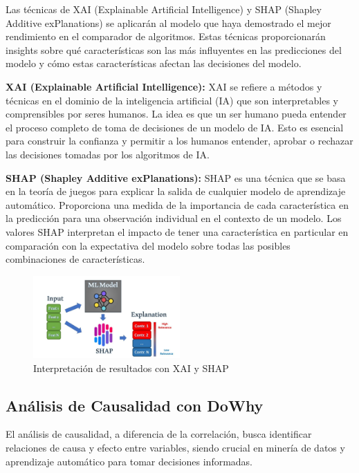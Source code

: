 Las técnicas de XAI (Explainable Artificial Intelligence) y SHAP (Shapley Additive exPlanations) se aplicarán al modelo que haya demostrado el mejor rendimiento en el comparador de algoritmos. Estas técnicas proporcionarán insights sobre qué características son las más influyentes en las predicciones del modelo y cómo estas características afectan las decisiones del modelo.

\textbf{XAI (Explainable Artificial Intelligence):} XAI se refiere a métodos y técnicas en el dominio de la inteligencia artificial (IA) que son interpretables y comprensibles por seres humanos. La idea es que un ser humano pueda entender el proceso completo de toma de decisiones de un modelo de IA. Esto es esencial para construir la confianza y permitir a los humanos entender, aprobar o rechazar las decisiones tomadas por los algoritmos de IA.

\textbf{SHAP (Shapley Additive exPlanations):} SHAP es una técnica que se basa en la teoría de juegos para explicar la salida de cualquier modelo de aprendizaje automático. Proporciona una medida de la importancia de cada característica en la predicción para una observación individual en el contexto de un modelo. Los valores SHAP interpretan el impacto de tener una característica en particular en comparación con la expectativa del modelo sobre todas las posibles combinaciones de características.

\begin{figure}[H]
  \centering
  \includegraphics[width=0.5\textwidth]{img/xai_shap.jpg}
  \caption{Interpretación de resultados con XAI y SHAP}
  \label{fig:xai_shap}
\end{figure}

\subsection{Análisis de Causalidad con DoWhy}

El análisis de causalidad, a diferencia de la correlación, busca identificar relaciones de causa y efecto entre variables, siendo crucial en minería de datos y aprendizaje automático para tomar decisiones informadas.

